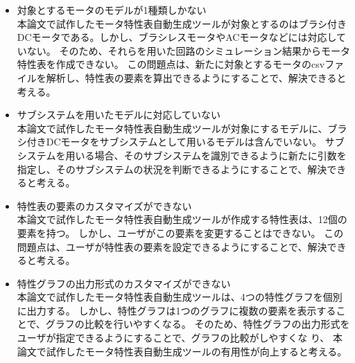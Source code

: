 \begin{itemize}
  \item 対象とするモータのモデルが1種類しかない\\
    本論文で試作したモータ特性表自動生成ツールが対象とするのはブラシ付きDCモータである。しかし、ブラシレスモータやACモータなどには対応していない。
    そのため、それらを用いた回路のシミュレーション結果からモータ特性表を作成できない。
    この問題点は、新たに対象とするモータのcsvファイルを解析し、特性表の要素を算出できるようにすることで、解決できると考える。

    \item サブシステムを用いたモデルに対応していない\\
    本論文で試作したモータ特性表自動生成ツールが対象にするモデルに、ブラシ付きDCモータをサブシステムとして用いるモデルは含んでいない。
    サブシステムを用いる場合、そのサブシステムを識別できるように新たに引数を指定し、そのサブシステムの状況を判断できるようにすることで、解決できると考える。  

\item 特性表の要素のカスタマイズができない\\
本論文で試作したモータ特性表自動生成ツールが作成する特性表は、12個の要素を持つ。
  しかし、ユーザがこの要素を変更することはできない。
  この問題点は、ユーザが特性表の要素を設定できるようにすることで、解決できると考える。

\item 特性グラフの出力形式のカスタマイズができない\\
本論文で試作したモータ特性表自動生成ツールは、4つの特性グラフを個別に出力する。
しかし、特性グラフは1つのグラフに複数の要素を表示することで、グラフの比較を行いやすくなる。
そのため、特性グラフの出力形式をユーザが指定できるようにすることで、グラフの比較がしやすくな
り、 本論文で試作したモータ特性表自動生成ツールの有用性が向上すると考える。


\end{itemize}







